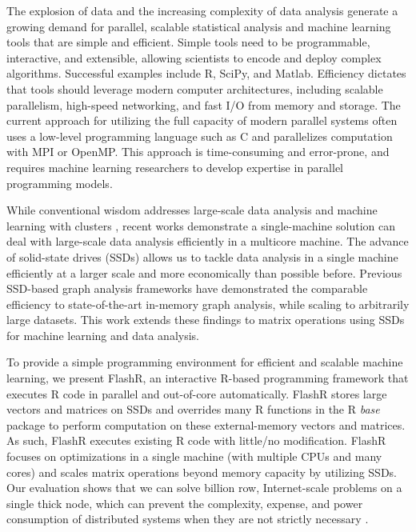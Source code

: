 
The explosion of data and the increasing complexity of data analysis
generate a growing demand for parallel, scalable statistical analysis
and machine learning tools that are simple and efficient.
Simple tools need to be programmable, interactive, and extensible,
allowing scientists to encode and deploy complex algorithms.
Successful examples include R, SciPy, and Matlab.  Efficiency dictates that
tools should leverage modern computer architectures, including scalable
parallelism, high-speed networking, and fast I/O from memory and storage.
The current approach for utilizing the full
capacity of modern parallel systems often uses a low-level programming
language such as C and parallelizes computation with MPI or OpenMP.
This approach is time-consuming and error-prone, and requires machine learning
researchers to develop expertise in parallel programming models.


While conventional wisdom addresses large-scale data analysis and machine
learning with clusters
\cite{mapreduce,spark,systemml,tensorflow,petuum,graphlab}, recent works
\cite{flashgraph,gridgraph,Matveev17,hotos} demonstrate a single-machine
solution can deal with large-scale data analysis efficiently in a multicore
machine. The advance of solid-state drives (SSDs) allows us to tackle data
analysis in a single machine efficiently at a larger scale and more economically
than possible before. Previous SSD-based graph analysis frameworks
\cite{flashgraph, gridgraph, graphene}
have demonstrated the comparable efficiency to state-of-the-art in-memory graph
analysis, while scaling to arbitrarily large datasets. This work extends
these findings to matrix operations using SSDs for machine learning and
data analysis.


To provide a simple programming environment for efficient and scalable machine
learning, we present FlashR, an interactive R-based programming framework that
executes R code in parallel and out-of-core automatically. FlashR stores large
vectors and matrices on SSDs and overrides many R functions in the R
\textit{base} package to perform computation on these external-memory vectors
and matrices.
As such, FlashR executes existing R code with little/no modification.
FlashR focuses on optimizations in a single machine (with multiple CPUs and
many cores) and scales matrix operations beyond memory capacity by
utilizing SSDs.
Our evaluation shows that we can solve billion row, Internet-scale
problems on a single thick node, which can prevent the complexity,
expense, and power consumption of distributed systems when they are
not strictly necessary \cite{hotos}.

